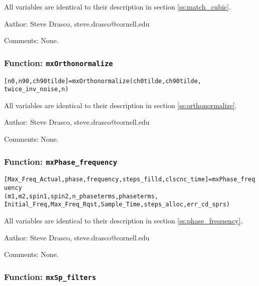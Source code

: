 All variables are identical to their description in section \ref{ss:match_cubic}.

\begin{description}
\item{Author:} Steve Drasco, steve.drasco@cornell.edu
\item{Comments:} None.
\end{description}

\subsubsection{Function: {\tt mxOrthonormalize}}
\label{sss:mxOrthonormalize}

\texttt{[n0,n90,ch90tilde]=mxOrthonormalize(ch0tilde,ch90tilde,} \\
\texttt{twice\_inv\_noise,n)}

All variables are identical to their description in section \ref{ss:orthonormalize}.

\begin{description}
\item{Author:} Steve Drasco, steve.drasco@cornell.edu
\item{Comments:} None.
\end{description}

\subsubsection{Function: {\tt mxPhase\_frequency}}
\label{sss:mxPhase_frequency}

\texttt{[Max\_Freq\_Actual,phase,frequency,steps\_filld,clscnc\_time]=mxPhase\_frequency} \\
\texttt{(m1,m2,spin1,spin2,n\_phaseterms,phaseterms,} \\
\texttt{Initial\_Freq,Max\_Freq\_Rqst,Sample\_Time,steps\_alloc,err\_cd\_sprs)}

All variables are identical to their description in section \ref{ss:phase_frequency}.

\begin{description}
\item{Author:} Steve Drasco, steve.drasco@cornell.edu
\item{Comments:} None.
\end{description}

\subsubsection{Function: {\tt mxSp\_filters}}
\label{sss:mxSp_filters}


